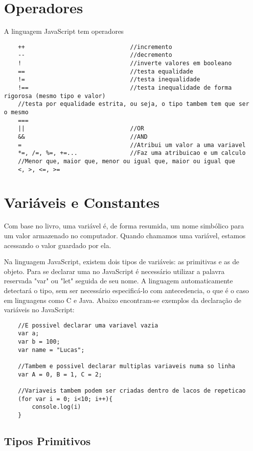     \section{Operadores}
    A linguagem JavaScript tem operadores
    \begin{lstlisting}
    ++								//incremento
    --								//decremento
    !								//inverte valores em booleano
    ==								//testa equalidade
    !=								//testa inequalidade
    !==								//testa inequalidade de forma rigorosa (mesmo tipo e valor)
    //testa por equalidade estrita, ou seja, o tipo tambem tem que ser o mesmo
    ===	
    ||								//OR
    &&								//AND
    =								//Atribui um valor a uma variavel
    *=, /=, %=, +=...				//Faz uma atribuicao e um calculo
    //Menor que, maior que, menor ou igual que, maior ou igual que
    <, >, <=, >=
    \end{lstlisting}
    \section{Vari\'{a}veis e Constantes}
    Com base no livro\cite{flanagan2020javascript}, uma variável é, de forma resumida, um nome simbólico para um valor armazenado no computador. Quando chamamos uma variável, estamos acessando o valor guardado por ela. 
   	\par Na linguagem JavaScript, existem dois tipos de variáveis: as primitivas e as de objeto. 
    Para se declarar uma no JavaScript é necessário utilizar a palavra reservada "var" ou "let" seguida de seu nome. A linguagem automaticamente detectará o tipo, sem ser necessário especificá-lo com antecedencia, o que é o caso em linguagens como C e Java. Abaixo encontram-se exemplos da declaração de variáveis no JavaScript:
    \newline
    
    \begin{lstlisting}
    //E possivel declarar uma variavel vazia
    var a;
    var b = 100;
    var name = "Lucas";
    
    //Tambem e possivel declarar multiplas variaveis numa so linha
    var A = 0, B = 1, C = 2;
    
    //Variaveis tambem podem ser criadas dentro de lacos de repeticao
    (for var i = 0; i<10; i++){
    	console.log(i)
    }
    \end{lstlisting}
    
    \subsection{Tipos Primitivos}
    
